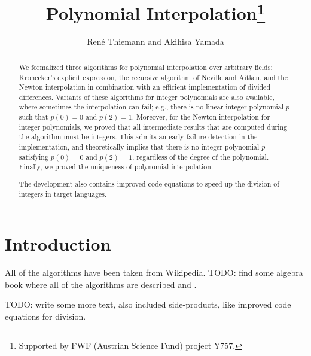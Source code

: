 \documentclass[11pt,a4paper]{article}
\begin{document}
\title{Polynomial Interpolation\footnote{Supported by FWF (Austrian Science Fund) project Y757.}}
\author{Ren\'e Thiemann and Akihisa Yamada}
\maketitle

\begin{abstract}
We formalized three algorithms for polynomial interpolation over arbitrary fields: 
Kronecker's explicit expression,
the recursive algorithm of Neville and Aitken,
and the Newton interpolation in combination with an efficient implementation of divided differences.
Variants of these algorithms for integer polynomials are also available,
where sometimes the interpolation can fail; e.g., there is no
linear integer polynomial $p$ such that $p(0) = 0$ and $p(2) = 1$. Moreover, for
the Newton interpolation for integer polynomials, we proved that all intermediate 
results that are computed during the algorithm must be integers.
This admits an early failure detection in the implementation, and theoretically implies that
there is no integer polynomial $p$ satisfying $p(0) = 0$ and $p(2) = 1$, regardless
of the degree of the polynomial.
Finally, we proved the uniqueness of polynomial interpolation.

The development also contains improved code equations to speed up the division of integers
in target languages.
\end{abstract}

\tableofcontents

\section{Introduction}

All of the algorithms have been taken from Wikipedia.
TODO: find some algebra book where all of the algorithms are described and \cite{it}.

TODO: write some more text, also included side-products, like improved code equations for
division.









\end{document}
